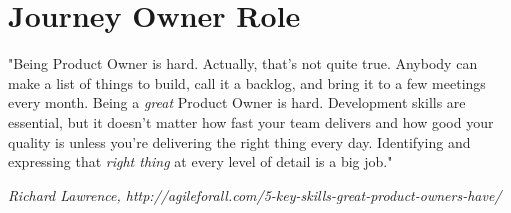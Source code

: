 \ifcontent 

    \chapter*{Journey Owner Role}
    
    \begin{framed}
       "Being Product Owner is hard. Actually, that's not quite true. Anybody can make a list of things to build, call it a backlog, and bring it to a few meetings every month. Being a \emph{great} Product Owner is hard. Development skills are essential, but it doesn't matter how fast your team delivers and how good your quality is unless you're delivering the right thing every day. Identifying and expressing that \emph{right thing} at every level of detail is a big job." 
       
       \begin{flushright}
            \textit{Richard Lawrence, http://agileforall.com/5-key-skills-great-product-owners-have/}
        \end{flushright}
    \end{framed}    
    
    \vspace{0.5cm}
    
    
\fi 